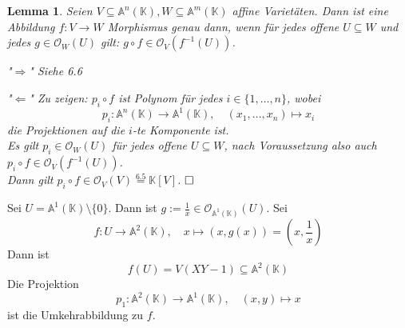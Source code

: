 \documentclass[11pt]{book}
\newtheorem{lemma}[theorem]{Lemma}
\theoremstyle{nonumberbreak}
\newenvironment{pr}[1][]{\ifthenelse{\equal{#1}{}}{\proof}{\proof[#1]}\rm}{\endproof}
\newenvironment{ex}[1][]{\ifthenelse{\equal{#1}{}}{\example}{\example[#1]}\rm}{\endexample}
\begin{document}
\begin{spacing}{1.3}
\begin{lemma} %
Seien $V \subseteq \mathbb{A}^n(\mathbb{K}), W \subseteq \mathbb{A}^m(\mathbb{K})$ affine Varietäten. Dann ist eine Abbildung $f: V \longrightarrow W$ Morphismus genau dann, wenn für jedes offene $U \subseteq W$ und jedes $g \in \mathcal{O}_W(U)$ gilt: $g \circ f \in \mathcal{O}_V(f^{-1}(U))$.
\begin{pr}
\begin{compactenum}
\item["$\Rightarrow$"] Siehe 6.6
\item["$\Leftarrow$"] Zu zeigen: $p_i \circ f $ ist Polynom für jedes $i \in \{1, \ldots, n\}$, wobei $$p_i: \mathbb{A}^n(\mathbb{K}) \longrightarrow \mathbb{A}^1(\mathbb{K}), \quad (x_1, \ldots, x_n) \mapsto x_i$$
die Projektionen auf die $i$-te Komponente ist.\\
Es gilt $p_i \in \mathcal{O}_W(U)$ für jedes offene $U \subseteq W$, nach Voraussetzung also auch $p_i \circ f \in \mathcal{O}_V(f^{-1}(U))$.\\
Dann gilt $p_i \circ f \in \mathcal{O}_V(V) \overset{6.5}{=} \mathbb{K}[V]$. $\hfill \Box$
\end{compactenum}
\end{pr}
\end{lemma}

\begin{ex}   %
Sei $U= \mathbb{A}^1(\mathbb{K}) \setminus \{0\}$. Dann ist $g:= \frac{1}{x} \in \mathcal{O}_{\mathbb{A}^1(\mathbb{K})}(U)$. Sei
$$f: U \longrightarrow \mathbb{A}^2(\mathbb{K}), \quad x \mapsto (x, g(x)) = \left(x, \frac{1}{x}\right)$$
Dann ist $$f(U) = V(XY-1) \subseteq \mathbb{A}^2(\mathbb{K})$$
Die Projektion
$$p_1: \mathbb{A}^2(\mathbb{K}) \longrightarrow \mathbb{A}^1(\mathbb{K}), \quad (x,y) \mapsto x $$
ist die Umkehrabbildung zu $f$.
\end{ex}


\end{spacing}
\end{document}
